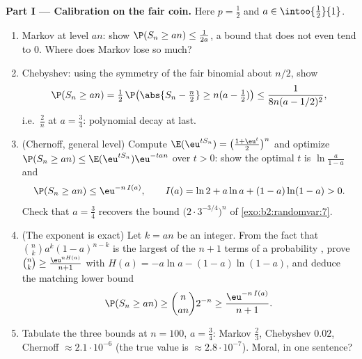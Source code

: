 \begin{problem}
\medskip
\noindent\textbf{Part I --- Calibration on the fair coin.}
Here $p = \frac12$ and $a \in \intoo{\frac12}{1}$.
\begin{enumerate}
  \item Markov at level $an$: show $\P(S_n \geq an) \leq
        \frac1{2a}$, a bound that does not even tend to $0$.
        Where does Markov lose so much?
  \item Chebyshev: using the symmetry of the fair binomial
        about $n/2$, show
        \[
        \P(S_n \geq an) = \tfrac12\,
        \P\bigl(\abs{S_n - \tfrac n2} \geq n(a -
        \tfrac12)\bigr)
        \leq \frac{1}{8n(a - 1/2)^2},
        \]
        i.e.\ $\frac2n$ at $a = \frac34$: polynomial decay at
        last.
  \item (Chernoff, general level) Compute
        $\E(\eu^{tS_n}) = \bigl(\frac{1 + \eu^t}2\bigr)^n$ and
        optimize $\P(S_n \geq an) \leq
        \E(\eu^{tS_n})\eu^{-tan}$ over $t > 0$: show the
        optimal $t$ is $\ln\frac{a}{1-a}$ and
        \[
        \P(S_n \geq an) \leq \eu^{-n\,I(a)},
        \qquad
        I(a) = \ln 2 + a\ln a + (1-a)\ln(1-a) > 0 .
        \]
        Check that $a = \frac34$ recovers the bound
        $\bigl(2\cdot3^{-3/4}\bigr)^n$ of
        \cref{exo:b2:randomvar:7}.
  \item (The exponent is exact) Let $k = an$ be an integer.
        From the fact that $\binom nk a^k(1-a)^{n-k}$ is the
        largest of the $n + 1$ terms of a probability
        , prove $\binom nk \geq
        \frac{\eu^{nH(a)}}{n+1}$ with $H(a) = -a\ln a -
        (1-a)\ln(1-a)$, and deduce the matching lower bound
        \[
        \P(S_n \geq an) \geq \binom{n}{an}2^{-n}
        \geq \frac{\eu^{-n\,I(a)}}{n + 1} .
        \]
  \item Tabulate the three bounds at $n = 100$, $a =
        \frac34$: Markov $\frac23$, Chebyshev $0.02$,
        Chernoff $\approx 2.1\cdot10^{-6}$ (the true value is
        $\approx 2.8\cdot10^{-7}$). Moral, in one sentence?
\end{enumerate}


\end{problem}
